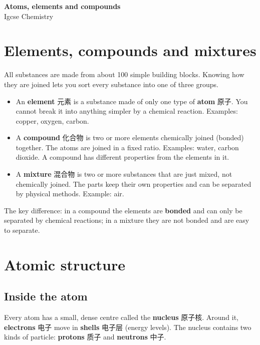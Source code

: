 \documentclass[11pt]{article}
\begin{document}
\begin{center}
  {\LARGE\bfseries Atoms, elements and compounds}\\[0.35em]
  {\large Igcse Chemistry}
\end{center}
\vspace{0.6em}

\section*{Elements, compounds and mixtures}

All substances are made from about 100 simple building blocks. Knowing how they are joined lets you sort every substance into one of three groups.

\begin{itemize}
\item An \textbf{element} 元素 is a substance made of only one type of \textbf{atom} 原子. You cannot break it into anything simpler by a chemical reaction. Examples: copper, oxygen, carbon.

\item A \textbf{compound} 化合物 is two or more elements chemically joined (bonded) together. The atoms are joined in a fixed ratio. Examples: water, carbon dioxide. A compound has different properties from the elements in it.

\item A \textbf{mixture} 混合物 is two or more substances that are just mixed, not chemically joined. The parts keep their own properties and can be separated by physical methods. Example: air.

\end{itemize}

The key difference: in a compound the elements are \textbf{bonded} and can only be separated by chemical reactions; in a mixture they are not bonded and are easy to separate.

\section*{Atomic structure}

\subsection*{Inside the atom}

Every atom has a small, dense centre called the \textbf{nucleus} 原子核. Around it, \textbf{electrons} 电子 move in \textbf{shells} 电子层 (energy levels). The nucleus contains two kinds of particle: \textbf{protons} 质子 and \textbf{neutrons} 中子.
\end{document}
